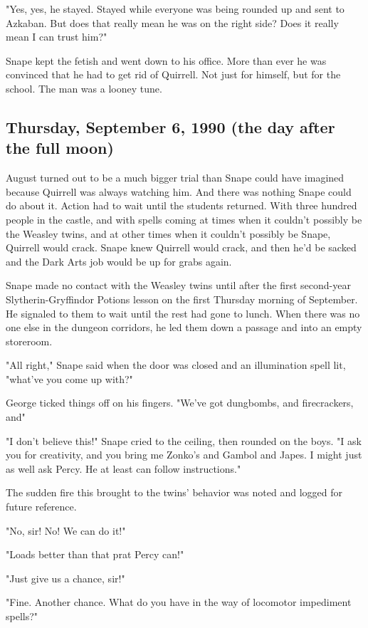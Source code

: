 "Yes, yes, he stayed. Stayed while everyone was being rounded up and sent to Azkaban. But does that really mean he was on the right side? Does it really mean I can trust him?"

Snape kept the fetish and went down to his office. More than ever he was convinced that he had to get rid of Quirrell. Not just for himself, but for the school. The man was a looney tune.

\subsection{Thursday, September 6, 1990 (the day after the full moon)}

August turned out to be a much bigger trial than Snape could have imagined because Quirrell was always watching him. And there was nothing Snape could do about it. Action had to wait until the students returned. With three hundred people in the castle, and with spells coming at times when it couldn't possibly be the Weasley twins, and at other times when it couldn't possibly be Snape, Quirrell would crack. Snape knew Quirrell would crack, and then he'd be sacked and the Dark Arts job would be up for grabs again.

Snape made no contact with the Weasley twins until after the first second-year Slytherin-Gryffindor Potions lesson on the first Thursday morning of September. He signaled to them to wait until the rest had gone to lunch. When there was no one else in the dungeon corridors, he led them down a passage and into an empty storeroom.

"All right," Snape said when the door was closed and an illumination spell lit, "what've you come up with?"

George ticked things off on his fingers. "We've got dungbombs, and firecrackers, and{\el}"

"I don't believe this!" Snape cried to the ceiling, then rounded on the boys. "I ask you for creativity, and you bring me Zonko's and Gambol and Japes. I might just as well ask Percy. He at least can follow instructions."

The sudden fire this brought to the twins' behavior was noted and logged for future reference.

"No, sir! No! We can do it!"

"Loads better than that prat Percy can!"

"Just give us a chance, sir!"

"Fine. Another chance. What do you have in the way of locomotor impediment spells?"

